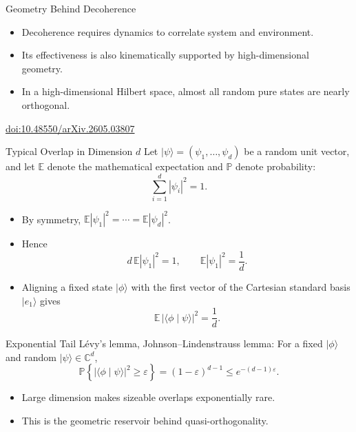 \documentclass[xcolor=dvipsnames]{beamer}
\newenvironment{slideitems}{%
  \begin{itemize}\setlength{\itemsep}{0.55em}\setlength{\parskip}{0pt}%
}{\end{itemize}}
\newcommand{\ket}[1]{\lvert #1\rangle}
\newcommand{\inner}[2]{\langle #1\mid #2\rangle}
\newcommand{\C}{\mathbb{C}}
\begin{document}
\begin{frame}{Geometry Behind Decoherence}
\begin{slideitems}
  \item Decoherence requires dynamics to correlate system and environment.
  \item Its effectiveness is also kinematically supported by high-dimensional
        geometry.
  \item In a high-dimensional Hilbert space, almost all random pure states are
        nearly orthogonal.
\end{slideitems}

\vspace{4mm}
\centering
\href{https://doi.org/10.48550/arXiv.2605.03807}{doi:10.48550/arXiv.2605.03807}
\end{frame}

\begin{frame}{Typical Overlap in Dimension $d$}
Let $\ket{\psi}=(\psi_1,\dots,\psi_d)$ be a random unit vector, and let $\mathbb{E}$ denote the mathematical expectation and $\mathbb{P}$ denote probability:
\[
  \sum_{i=1}^{d}|\psi_i|^2=1.
\]

\begin{slideitems}
  \item By symmetry,
        $\mathbb{E}|\psi_1|^2=\cdots=\mathbb{E}|\psi_d|^2$.
  \item Hence
        \[
          d\,\mathbb{E}|\psi_1|^2=1,
          \qquad
          \mathbb{E}|\psi_1|^2=\frac{1}{d}.
        \]
  \item Aligning a fixed state $\ket{\phi}$ with the first vector of the Cartesian standard basis $\ket{e_1}$ gives
        \[
          \mathbb{E}\,\bigl|\inner{\phi}{\psi}\bigr|^2=\frac{1}{d}.
        \]
\end{slideitems}
\end{frame}

\begin{frame}{Exponential Tail}
L\'evy's lemma, Johnson--Lindenstrauss lemma:
For a fixed $\ket{\phi}$ and random $\ket{\psi}\in\C^d$,
\[
  \mathbb{P}\!\left\{\bigl|\inner{\phi}{\psi}\bigr|^2\ge\varepsilon\right\}
  =(1-\varepsilon)^{d-1}
  \le e^{-(d-1)\varepsilon}.
\]

\vspace{3mm}
\begin{slideitems}
  \item Large dimension makes sizeable overlaps exponentially rare.
  \item This is the geometric reservoir behind quasi-orthogonality.
\end{slideitems}
\end{frame}
\end{document}
